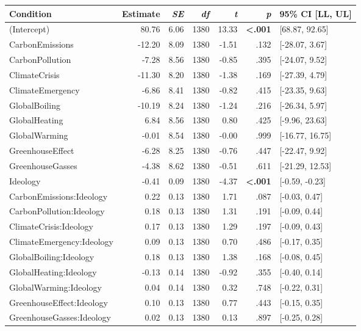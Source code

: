 \begin{table}[ht]
\centering
\begin{tabular}{lrrrrrl}
  \hline
Condition & Estimate & \textit{SE} & \textit{df} & \textit{t} & \textit{p} & 95\% CI [LL, UL] \\ 
  \hline
(Intercept) & 80.76 & 6.06 & 1380 & 13.33 & \textbf{\textless  .001} & [68.87, 92.65] \\ 
  CarbonEmissions & -12.20 & 8.09 & 1380 & -1.51 & .132 & [-28.07, 3.67] \\ 
  CarbonPollution & -7.28 & 8.56 & 1380 & -0.85 & .395 & [-24.07, 9.52] \\ 
  ClimateCrisis & -11.30 & 8.20 & 1380 & -1.38 & .169 & [-27.39, 4.79] \\ 
  ClimateEmergency & -6.86 & 8.41 & 1380 & -0.82 & .415 & [-23.35, 9.63] \\ 
  GlobalBoiling & -10.19 & 8.24 & 1380 & -1.24 & .216 & [-26.34, 5.97] \\ 
  GlobalHeating & 6.84 & 8.56 & 1380 & 0.80 & .425 & [-9.96, 23.63] \\ 
  GlobalWarming & -0.01 & 8.54 & 1380 & -0.00 & .999 & [-16.77, 16.75] \\ 
  GreenhouseEffect & -6.28 & 8.25 & 1380 & -0.76 & .447 & [-22.47, 9.92] \\ 
  GreenhouseGasses & -4.38 & 8.62 & 1380 & -0.51 & .611 & [-21.29, 12.53] \\ 
  Ideology & -0.41 & 0.09 & 1380 & -4.37 & \textbf{\textless  .001} & [-0.59, -0.23] \\ 
  CarbonEmissions:Ideology & 0.22 & 0.13 & 1380 & 1.71 & .087 & [-0.03, 0.47] \\ 
  CarbonPollution:Ideology & 0.18 & 0.13 & 1380 & 1.31 & .191 & [-0.09, 0.44] \\ 
  ClimateCrisis:Ideology & 0.17 & 0.13 & 1380 & 1.29 & .197 & [-0.09, 0.43] \\ 
  ClimateEmergency:Ideology & 0.09 & 0.13 & 1380 & 0.70 & .486 & [-0.17, 0.35] \\ 
  GlobalBoiling:Ideology & 0.18 & 0.13 & 1380 & 1.38 & .168 & [-0.08, 0.45] \\ 
  GlobalHeating:Ideology & -0.13 & 0.14 & 1380 & -0.92 & .355 & [-0.40, 0.14] \\ 
  GlobalWarming:Ideology & 0.04 & 0.14 & 1380 & 0.32 & .748 & [-0.22, 0.31] \\ 
  GreenhouseEffect:Ideology & 0.10 & 0.13 & 1380 & 0.77 & .443 & [-0.15, 0.35] \\ 
  GreenhouseGasses:Ideology & 0.02 & 0.13 & 1380 & 0.13 & .897 & [-0.25, 0.28] \\ 
   \hline
\end{tabular}
\end{table}
